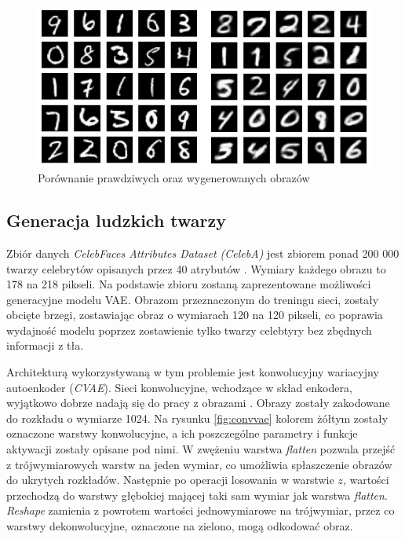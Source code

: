 \documentclass[a4paper,12pt,oneside]{book} %
\begin{document}
\begin{figure}[h!]
	\centering
	\includegraphics[width=12cm]{vaegeneracja.png}
	\caption{Porównanie prawdziwych oraz wygenerowanych obrazów}
	\label{fig:vaegeneracja}
\end{figure}

\subsection{Generacja ludzkich twarzy}
Zbiór danych \textit{CelebFaces Attributes Dataset (CelebA)} jest zbiorem ponad 200 000 twarzy celebrytów opisanych przez 40 atrybutów \cite{celeba}. Wymiary każdego obrazu to 178 na 218 pikseli. Na podstawie zbioru zostaną zaprezentowane możliwości generacyjne modelu VAE. Obrazom przeznaczonym do treningu sieci, zostały obcięte brzegi, zostawiając obraz o wymiarach 120 na 120 pikseli, co poprawia wydajność modelu poprzez zostawienie tylko twarzy celebtyry bez zbędnych informacji z tła.

Architekturą wykorzystywaną w tym problemie jest konwolucyjny wariacyjny autoenkoder (\textit{CVAE}). Sieci konwolucyjne, wchodzące w skład enkodera, wyjątkowo dobrze nadają się do pracy z obrazami \cite{convvae}. Obrazy zostały zakodowane do rozkładu o wymiarze 1024. Na rysunku \ref{fig:convvae} kolorem żółtym zostały oznaczone warstwy konwolucyjne, a ich poszczególne parametry i funkcje aktywacji zostały opisane pod nimi. W zwężeniu warstwa \textit{flatten} pozwala przejść z trójwymiarowych warstw na jeden wymiar, co umożliwia spłaszczenie obrazów do ukrytych rozkładów. Następnie po operacji losowania w warstwie $z$, wartości przechodzą do warstwy głębokiej mającej taki sam wymiar jak warstwa \textit{flatten}. \textit{Reshape} zamienia z powrotem wartości jednowymiarowe na trójwymiar, przez co warstwy dekonwolucyjne, oznaczone na zielono, mogą odkodować obraz.
\end{document}
